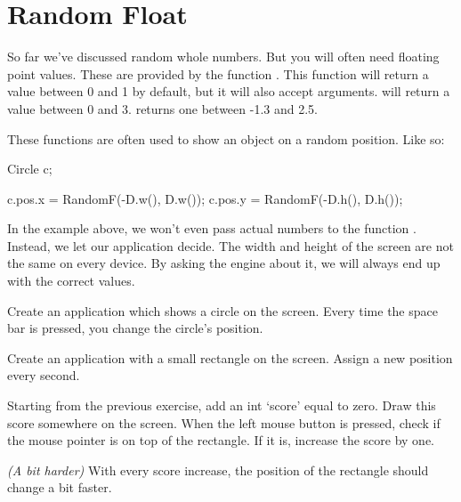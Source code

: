 \section{Random Float}
So far we've discussed random whole numbers. But you will often need floating point values. These are provided by the function . This function will return a value between 0 and 1 by default, but it will also accept arguments.  will return a value between 0 and 3.  returns one between -1.3 and 2.5.

These functions are often used to show an object on a random position. Like so:

\begin{code}
Circle c;

c.pos.x = RandomF(-D.w(), D.w());
c.pos.y = RandomF(-D.h(), D.h());
\end{code}

In the example above, we won't even pass actual numbers to the function . Instead, we let our application decide. The width and height of the screen are not the same on every device. By asking the engine about it, we will always end up with the correct values.

\begin{exercise}
Create an application which shows a circle on the screen. Every time the space bar is pressed, you change the circle's position.
\end{exercise}
\begin{exercise}
Create an application with a small rectangle on the screen. Assign a new position every second. 
\end{exercise}
\begin{exercise}
Starting from the previous exercise, add an int `score' equal to zero. Draw this score somewhere on the screen. When the left mouse button is pressed, check if the mouse pointer is on top of the rectangle. If it is, increase the score by one.
\end{exercise}
\begin{exercise}
\textit{(A bit harder)} With every score increase, the position of the rectangle should change a bit faster.
\end{exercise}



